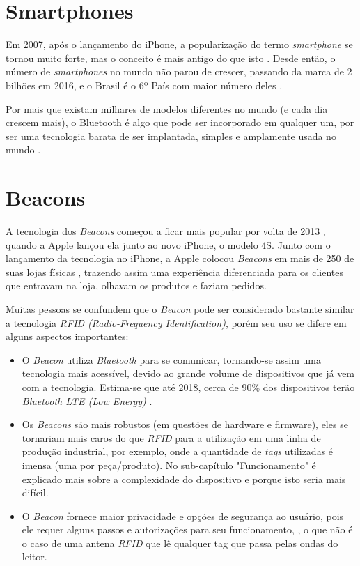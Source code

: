 \documentclass[
	12pt,
	oneside,
	a4paper,
	english,
	brazil,
]{abntex2}
\begin{document}
\section{Smartphones}

Em 2007, após o lançamento do iPhone, a popularização do termo \emph{smartphone} se tornou muito forte, mas o conceito é mais antigo do que isto \cite{smartphone-history-pictures}. Desde então, o número de \emph{smartphones} no mundo não parou de crescer, passando da marca de 2 bilhões em 2016, e o Brasil é o 6º País com maior número deles \cite{smartphone-numbers}.

Por mais que existam milhares de modelos diferentes no mundo (e cada dia crescem mais), o Bluetooth é algo que pode ser incorporado em qualquer um, por ser uma tecnologia barata de ser implantada, simples e amplamente usada no mundo \cite{smartphone-android-models}.

\section{Beacons}

A tecnologia dos \emph{Beacons} começou a ficar mais popular por volta de 2013 \cite{beacon-what-is-it-forbes}, quando a Apple lançou ela junto ao novo iPhone, o modelo 4S. Junto com o lançamento da tecnologia no iPhone, a Apple colocou \emph{Beacons} em mais de 250 de suas lojas físicas \cite{beacon-apple-store-case}, trazendo assim uma experiência diferenciada para os clientes que entravam na loja, olhavam os produtos e faziam pedidos.

Muitas pessoas se confundem que o \emph{Beacon} pode ser considerado bastante similar a tecnologia \emph{RFID (Radio-Frequency Identification)}, porém seu uso se difere em alguns aspectos importantes:

\begin{itemize}
    \item O \emph{Beacon} utiliza \emph{Bluetooth} para se comunicar, tornando-se assim uma tecnologia mais acessível, devido ao grande volume de dispositivos que já vem com a tecnologia. Estima-se que até 2018, cerca de 90\% dos dispositivos terão \emph{Bluetooth LTE (Low Energy)} \cite{beacon-devices-estimate-2018}.
    \item Os \emph{Beacons} são mais robustos (em questões de hardware e firmware), eles se tornariam mais caros do que \emph{RFID} para a utilização em uma linha de produção industrial, por exemplo, onde a quantidade de \emph{tags} utilizadas é imensa (uma por peça/produto). No sub-capítulo "Funcionamento" é explicado mais sobre a complexidade do dispositivo e porque isto seria mais difícil.
    \item O \emph{Beacon} fornece maior privacidade e opções de segurança ao usuário, pois ele requer alguns passos e autorizações para seu funcionamento, \cite{beacon-apple-store-case}, o que não é o caso de uma antena \emph{RFID} que lê qualquer tag que passa pelas ondas do leitor.
\end{itemize}
\end{document}
